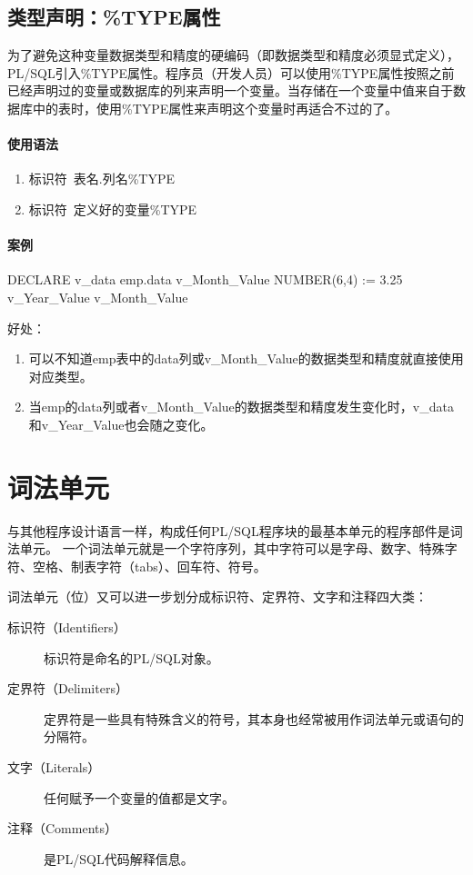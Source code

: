 \documentclass[11pt, a4paper, oneside, UTF8]{ctexbook}
\begin{document}
\section{类型声明：\%TYPE属性}
为了避免这种变量数据类型和精度的硬编码（即数据类型和精度必须显式定义），PL/SQL引入\%TYPE属性。程序员（开发人员）可以使用\%TYPE属性按照之前已经声明过的变量或数据库的列来声明一个变量。当存储在一个变量中值来自于数据库中的表时，使用\%TYPE属性来声明这个变量时再适合不过的了。

\subsubsection{使用语法}
\begin{enumerate}
  \item 标识符\ 表名.列名\%TYPE
  \item 标识符\ 定义好的变量\%TYPE
\end{enumerate}
\subsubsection{案例}
\begin{plsql}
DECLARE
  v_data emp.data%
  v_Month_Value NUMBER(6,4) := 3.25
  v_Year_Value v_Month_Value%
\end{plsql}
好处：
\begin{enumerate}
  \item 可以不知道emp表中的data列或v\_Month\_Value的数据类型和精度就直接使用对应类型。
  \item 当emp的data列或者v\_Month\_Value的数据类型和精度发生变化时，v\_data和v\_Year\_Value也会随之变化。
\end{enumerate}

\chapter{词法单元}
与其他程序设计语言一样，构成任何PL/SQL程序块的最基本单元的程序部件是词法单元。
一个词法单元就是一个字符序列，其中字符可以是字母、数字、特殊字符、空格、制表字符（tabs）、回车符、符号。

词法单元（位）又可以进一步划分成标识符、定界符、文字和注释四大类：
\begin{description}
  \item[标识符（Identifiers）] 标识符是命名的PL/SQL对象。
  \item[定界符（Delimiters）] 定界符是一些具有特殊含义的符号，其本身也经常被用作词法单元或语句的分隔符。
  \item[文字（Literals）] 任何赋予一个变量的值都是文字。
  \item[注释（Comments）] 是PL/SQL代码解释信息。
\end{description}
\end{document}
